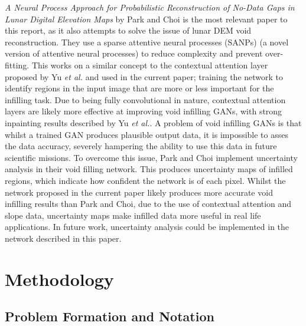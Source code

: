 \documentclass[twocolumn]{article}
\begin{document}
\emph{A Neural Process Approach for Probabilistic Reconstruction of No-Data Gaps in Lunar Digital Elevation Maps} by Park and Choi\autocite{parkNeuralProcessApproach2021} is the most relevant paper to this report, as it also attempts to solve the issue of lunar DEM void reconstruction.
They use a sparse attentive neural processes (SANPs) (a novel version of attentive neural processes\autocite{kimAttentiveNeuralProcesses2019}) to reduce complexity and prevent over-fitting.
This works on a similar concept to the contextual attention layer proposed by Yu \emph{et al.}\autocite{yuGenerativeImageInpainting2018} and used in the current paper; training the network to identify regions in the input image that are more or less important for the infilling task.
Due to being fully convolutional in nature, contextual attention layers are likely more effective at improving void infilling GANs, with strong inpainting results described by Yu \emph{et al.}\autocite{yuGenerativeImageInpainting2018}.
A problem of void infilling GANs is that whilst a trained GAN produces plausible output data, it is impossible to asses the data accuracy, severely hampering the ability to use this data in future scientific missions.
To overcome this issue, Park and Choi\autocite{parkNeuralProcessApproach2021} implement uncertainty analysis in their void filling network.
This produces uncertainty maps of infilled regions, which indicate how confident the network is of each pixel.
Whilst the network proposed in the current paper likely produces more accurate void infilling results than Park and Choi\autocite{parkNeuralProcessApproach2021}, due to the use of contextual attention and slope data, uncertainty maps make infilled data more useful in real life applications.
In future work, uncertainty analysis could be implemented in the network described in this paper.

\autocite{zhangVoidFillingBased2020}

\autocite{dongFillingVoidsElevation2020}

\autocite{stolzleReconstructingOccludedElevation2022}

\autocite{qiuVoidFillingDigital2019}


\section{Methodology}
\label{sec:orgcf59521}
\subsection{Problem Formation and Notation}
\label{sec:org6d7d176}
\end{document}
